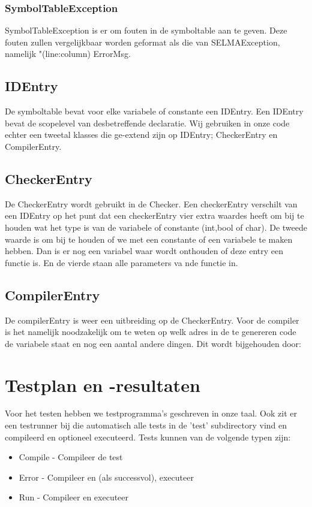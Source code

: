 \documentclass[]{article}
\begin{document}
\subsubsection{SymbolTableException}
SymbolTableException is er om fouten in de symboltable aan te geven. Deze fouten zullen vergelijkbaar worden geformat als die van SELMAException, namelijk "(line:column) ErrorMsg.

\subsection{IDEntry}
De symboltable bevat voor elke variabele of constante een IDEntry. Een IDEntry bevat de scopelevel van desbetreffende declaratie. Wij gebruiken in onze code echter een tweetal klasses die ge-extend zijn op IDEntry; CheckerEntry en CompilerEntry.

\subsection{CheckerEntry}
De CheckerEntry wordt gebruikt in de Checker. Een checkerEntry verschilt van een IDEntry op het punt dat een checkerEntry vier extra waardes heeft om bij te houden wat het type is van de variabele of constante (int,bool of char). De tweede waarde is om bij te houden of we met een constante of een variabele te maken hebben. Dan is er nog een variabel waar wordt onthouden of deze entry een functie is. En de vierde staan alle parameters va nde functie in.


\subsection{CompilerEntry}
De compilerEntry is weer een uitbreiding op de CheckerEntry. Voor de compiler is het namelijk noodzakelijk om te weten op welk adres in de te genereren code de variabele staat en nog een aantal andere dingen. Dit wordt bijgehouden door:


\newpage
\section{Testplan en -resultaten}
Voor het testen hebben we testprogramma's geschreven in onze taal. Ook zit er een testrunner bij die automatisch alle tests in de 'test' subdirectory vind en compileerd en optioneel executeerd.
Tests kunnen van de volgende typen zijn:
\begin{itemize}
	\item Compile - Compileer de test
	\item Error	    - Compileer en (als successvol), executeer
	\item Run		    - Compileer en executeer
\end{itemize}
\end{document}
